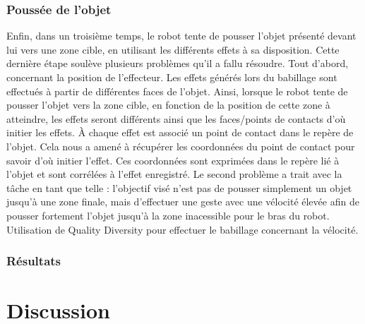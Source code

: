 \documentclass{llncs}
\begin{document}
\subsubsection{Poussée de l'objet}
Enfin, dans un troisième temps, le robot tente de pousser l'objet présenté devant lui vers une zone cible, en utilisant les différents effets à sa disposition. Cette dernière étape soulève plusieurs problèmes qu'il a fallu résoudre. Tout d'abord, concernant la position de l'effecteur. Les effets générés lors du babillage sont effectués à partir de différentes faces de l'objet. Ainsi, lorsque le robot tente de pousser l'objet vers la zone cible, en fonction de la position de cette zone à atteindre, les effets seront différents ainsi que les faces/points de contacts d'où initier les effets. \`A chaque effet est associé un point de contact dans le repère de l'objet. Cela nous a amené à récupérer les coordonnées du point de contact pour savoir d'où initier l'effet. Ces coordonnées sont exprimées dans le repère lié à l'objet et sont corrélées à l'effet enregistré. Le second problème a trait avec la tâche en tant que telle : l'objectif visé n'est pas de pousser simplement un objet jusqu'à une zone finale, mais d'effectuer une geste avec une vélocité élevée afin de pousser fortement l'objet jusqu'à la zone inacessible pour le bras du robot. Utilisation de Quality Diversity pour effectuer le babillage concernant la vélocité.

\subsubsection{Résultats}




\section{Discussion}
\end{document}
